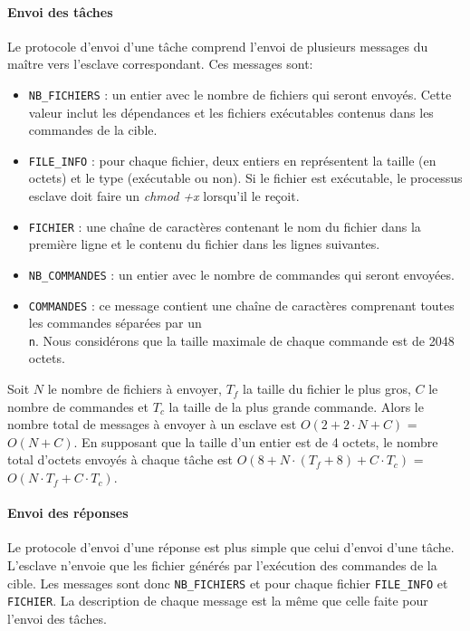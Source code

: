 \documentclass[a4paper,12pt,twoside]{article}
\begin{document}
\paragraph{Envoi des tâches}
Le protocole d'envoi d'une tâche comprend l'envoi de plusieurs
messages du maître vers l'esclave correspondant. Ces messages sont:
\begin{itemize}
\item \texttt{NB\_FICHIERS} : un entier avec le nombre de fichiers qui seront envoyés. Cette valeur inclut les dépendances et les fichiers exécutables contenus dans les commandes de la cible.
\item \texttt{FILE\_INFO} : pour chaque fichier, deux entiers en représentent la taille  (en octets) et le type (exécutable ou non). Si le fichier est exécutable, le processus esclave doit faire un \emph{chmod +x} lorsqu'il le reçoit.
\item \texttt{FICHIER} : une chaîne de caractères contenant le nom du
  fichier dans la première ligne et le contenu du fichier dans les lignes suivantes.
\item \texttt{NB\_COMMANDES} : un entier avec le nombre de commandes qui seront envoyées.
\item \texttt{COMMANDES} : ce message contient une chaîne de
  caractères comprenant toutes les commandes séparées par un
  \texttt{\\n}. Nous considérons que la taille maximale de chaque
  commande est de 2048 octets. 
\end{itemize}

Soit \texttt{$N$} le nombre de fichiers à envoyer, \texttt{$T_f$} la
taille du fichier le plus gros, \texttt{$C$} le nombre de commandes et
\texttt{$T_c$} la taille de la plus grande commande. Alors le nombre
total de messages à envoyer à un esclave est \texttt{$O(2 + 2 \cdot N
  + C)$} = \texttt{$O(N + C)$}. En supposant que la taille d'un entier
est de 4 octets, le nombre total d'octets envoyés à chaque tâche est
\texttt{$O(8 + N \cdot (T_f+8) + C \cdot T_c)$} = \texttt{$O(N \cdot
  T_f + C \cdot T_c)$}. 

\paragraph{Envoi des réponses}
Le protocole d'envoi d'une réponse est plus simple que celui d'envoi
d'une tâche. L'esclave n'envoie que les fichier générés par
l'exécution des commandes de la cible. Les messages sont donc
\texttt{NB\_FICHIERS} et pour chaque fichier \texttt{FILE\_INFO} et
\texttt{FICHIER}. La description de chaque message est la même que
celle faite pour l'envoi des tâches. 
\end{document}
